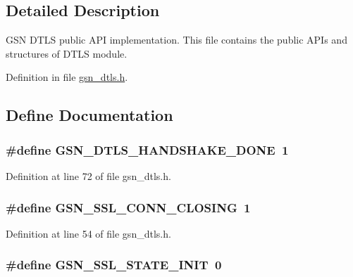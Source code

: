 \subsection{Detailed Description}
GSN DTLS public API implementation. This file contains the public APIs and structures of DTLS module. 

Definition in file \hyperlink{a00487_source}{gsn\_\-dtls.h}.



\subsection{Define Documentation}
\hypertarget{a00487_a39e3d43d3d0cb8d8acafb3d7e30faa57}{
\subsubsection[{GSN\_\-DTLS\_\-HANDSHAKE\_\-DONE}]{\setlength{\rightskip}{0pt plus 5cm}\#define GSN\_\-DTLS\_\-HANDSHAKE\_\-DONE~1}}
\label{a00487_a39e3d43d3d0cb8d8acafb3d7e30faa57}


Definition at line 72 of file gsn\_\-dtls.h.

\hypertarget{a00487_a4a58c10b1fe6239becbe4c24ace70aef}{
\subsubsection[{GSN\_\-SSL\_\-CONN\_\-CLOSING}]{\setlength{\rightskip}{0pt plus 5cm}\#define GSN\_\-SSL\_\-CONN\_\-CLOSING~1}}
\label{a00487_a4a58c10b1fe6239becbe4c24ace70aef}


Definition at line 54 of file gsn\_\-dtls.h.

\hypertarget{a00487_ab67365eb248a84bc175c126841099a48}{
\subsubsection[{GSN\_\-SSL\_\-STATE\_\-INIT}]{\setlength{\rightskip}{0pt plus 5cm}\#define GSN\_\-SSL\_\-STATE\_\-INIT~0}}
\label{a00487_ab67365eb248a84bc175c126841099a48}


